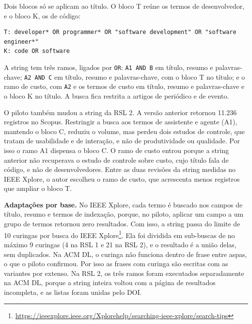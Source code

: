 \noindent Dois blocos só se aplicam ao título. O bloco T reúne os termos de
desenvolvedor, e o bloco K, os de código:

{\footnotesize
\begin{verbatim}
T: developer* OR programmer* OR "software development" OR "software engineer*"
K: code OR software
\end{verbatim}
}

\noindent A string tem três ramos, ligados por \texttt{OR}:
\texttt{A1 AND B} em título, resumo e palavras-chave; \texttt{A2 AND C} em
título, resumo e palavras-chave, com o bloco T no título; e o ramo de custo,
com \texttt{A2} e os termos de custo em título, resumo e palavras-chave e o
bloco K no título. A busca fica restrita a artigos de periódico e de evento.


O piloto também mudou a string da RSL 2. A versão anterior retornou 11.236
registros no Scopus. Restringir a busca aos termos de assistente e agente
(A1), mantendo o bloco C, reduziu o volume, mas perdeu dois estudos de
controle, que tratam de usabilidade e de interação, e não de produtividade ou
qualidade. Por isso o ramo A1 dispensa o bloco C. O ramo de custo entrou
porque a string anterior não recuperava o estudo de controle sobre custo, cujo
título fala de código, e não de desenvolvedores. Entre as duas revisões da
string medidas no IEEE Xplore, o autor escolheu o ramo de custo, que acrescenta
menos registros que ampliar o bloco T.

\textbf{Adaptações por base.} No IEEE Xplore, cada termo é buscado nos campos
de título, resumo e termos de indexação, porque, no piloto, aplicar um campo a
um grupo de termos retornou zero resultados. Com isso, a string passa do
limite de 10 curingas por busca do
IEEE Xplore\footnote{\url{https://ieeexplore.ieee.org/Xplorehelp/searching-ieee-xplore/search-tips}}.
Ela foi dividida em sub-buscas de no máximo 9 curingas (4 na RSL 1 e 21 na
RSL 2), e o resultado é a união delas, sem duplicados. Na ACM DL, o curinga
não funciona dentro de frase entre aspas, o que o piloto confirmou. Por isso
as frases com curinga são escritas com as variantes por extenso. Na RSL 2, os
três ramos foram executados separadamente na ACM DL, porque a string inteira
voltou com a página de resultados incompleta, e as listas foram unidas pelo
DOI.

